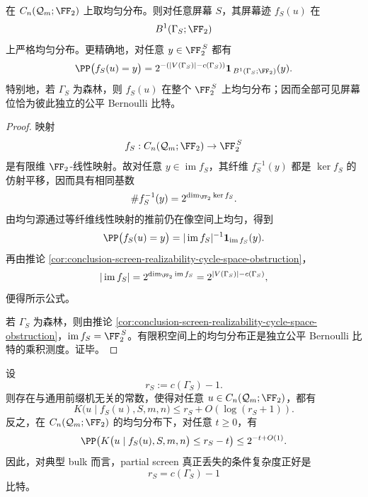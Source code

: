 \begin{theorem}\label{thm:conclusion-uniform-bulk-cut-space-uniformization}
在 \(C_n(\mathcal Q_m;\FF_2)\) 上取均匀分布。则对任意屏幕 \(S\)，其屏幕迹 \(f_S(u)\) 在
\[
B^1(\Gamma_S;\FF_2)
\]
上严格均匀分布。更精确地，对任意 \(y\in \FF_2^{\,S}\) 都有
\[
\PP\bigl(f_S(u)=y\bigr)
=
2^{-(|V(\Gamma_S)|-c(\Gamma_S))}
\mathbf 1_{\,B^1(\Gamma_S;\FF_2)}(y).
\]
特别地，若 \(\Gamma_S\) 为森林，则 \(f_S(u)\) 在整个 \(\FF_2^{\,S}\) 上均匀分布；因而全部可见屏幕位恰为彼此独立的公平 Bernoulli 比特。
\end{theorem}

\begin{proof}
映射
\[
f_S:C_n(\mathcal Q_m;\FF_2)\to \FF_2^{\,S}
\]
是有限维 \(\FF_2\)-线性映射。故对任意 \(y\in\operatorname{im}f_S\)，其纤维 \(f_S^{-1}(y)\) 都是 \(\ker f_S\) 的仿射平移，因而具有相同基数
\[
\#f_S^{-1}(y)=2^{\dim_{\FF_2}\ker f_S}.
\]
由均匀源通过等纤维线性映射的推前仍在像空间上均匀，得到
\[
\PP\bigl(f_S(u)=y\bigr)=|\operatorname{im}f_S|^{-1}\mathbf 1_{\operatorname{im}f_S}(y).
\]
再由推论 \ref{cor:conclusion-screen-realizability-cycle-space-obstruction}，
\[
|\operatorname{im}f_S|
=
2^{\dim_{\FF_2}\operatorname{im}f_S}
=
2^{|V(\Gamma_S)|-c(\Gamma_S)},
\]
便得所示公式。

若 \(\Gamma_S\) 为森林，则由推论 \ref{cor:conclusion-screen-realizability-cycle-space-obstruction}，\(\operatorname{im}f_S=\FF_2^{\,S}\)。有限积空间上的均匀分布正是独立公平 Bernoulli 比特的乘积测度。证毕。
\end{proof}

\begin{theorem}\label{thm:conclusion-screen-deficit-algorithmic-sharpness}
设
\[
r_S:=c(\Gamma_S)-1.
\]
则存在与通用前缀机无关的常数，使得对任意 \(u\in C_n(\mathcal Q_m;\FF_2)\)，都有
\[
K\bigl(u\mid f_S(u),S,m,n\bigr)
\le
r_S+O(\log(r_S+1)).
\]
反之，在 \(C_n(\mathcal Q_m;\FF_2)\) 的均匀分布下，对任意 \(t\ge 0\)，有
\[
\PP\!\left(
K\bigl(u\mid f_S(u),S,m,n\bigr)\le r_S-t
\right)
\le
2^{-t+O(1)}.
\]
因此，对典型 bulk 而言，partial screen 真正丢失的条件复杂度正好是
\[
r_S=c(\Gamma_S)-1
\]
比特。
\end{theorem}

